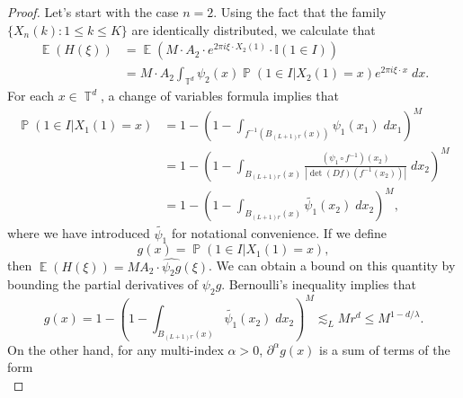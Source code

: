 \documentclass[dvipsnames,letterpaper,12pt]{article}
\numberwithin{equation}{section}
\DeclareMathOperator{\TT}{\mathbb{T}}
\numberwithin{theorem}{section}
\DeclareMathOperator{\EE}{\mathbb{E}}
\DeclareMathOperator{\PP}{\mathbb{P}}
\begin{document}
\begin{proof}


    Let's start with the case $n = 2$. Using the fact that the family $\{ X_n(k) : 1 \leq k \leq K \}$ are identically distributed, we calculate that
    \begin{equation} \label{equationDJACIOJCOWIJ}
    \begin{split}
        \EE(H(\xi)) &= \EE ( M \cdot A_2 \cdot e^{2 \pi i \xi \cdot X_2(1)} \cdot \mathbb{I}(1 \in I) )\\
        &= M \cdot A_2 \int_{\TT^d} \psi_2(x) \PP \left( 1 \in I | X_2(1) = x \right) e^{2 \pi i \xi \cdot x}\; dx.
    \end{split}
    \end{equation}
    For each $x \in \TT^d$, a change of variables formula implies that
    \begin{equation}
    \begin{split}
        \PP(1 \in I | X_1(1) = x) &= 1 - \left( 1 - \int_{f^{-1}(B_{(L+1)r}(x))} \psi_1(x_1)\; dx_1 \right)^M\\
        &= 1 - \left( 1 - \int_{B_{(L+1) r}(x)} \frac{(\psi_1 \circ f^{-1})(x_2)}{|\det(Df)(f^{-1}(x_2))|}\; dx_2 \right)^M\\
        &= 1 - \left( 1 - \int_{B_{(L+1)r}(x)} \tilde{\psi_1}(x_2)\; dx_2 \right)^M,
    \end{split}
    \end{equation}
    where we have introduced $\tilde{\psi_1}$ for notational convenience. If we define
    \[ g(x) = \PP(1 \in I| X_1(1) = x), \]
    then $\EE(H(\xi)) = M A_2 \cdot \widehat{\psi_2 g}(\xi)$. We can obtain a bound on this quantity by bounding the partial derivatives of $\psi_2 g$. Bernoulli's inequality implies that
    \begin{equation}
        g(x) = 1 - \left( 1 - \int_{B_{(L+1)r}(x)} \tilde{\psi_1}(x_2)\; dx_2 \right)^M \lesssim_L M r^d \leq M^{1 - d/\lambda}.
    \end{equation}
    On the other hand, for any multi-index $\alpha > 0$, $\partial^\alpha g(x)$ is a sum of terms of the form
    \begin{equation} \label{equationDOIJACOIJCIOJ3123123214312}

\end{equation}
\end{proof}
\end{document}
